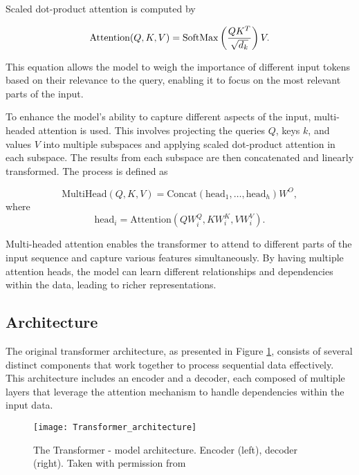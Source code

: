 \documentclass[../../thesis.tex]{subfiles}
\begin{document}
Scaled dot-product attention is computed by 

\begin{equation}
    \text{Attention}(Q,K,V) = \operatorname{SoftMax} \left(\frac{QK^T}{\sqrt{d_k}}\right)V.
\end{equation}

This equation allows the model to weigh the importance of different input tokens based on their relevance to the query, enabling it to focus on the most relevant parts of the input.\newline


To enhance the model's ability to capture different aspects of the input, multi-headed attention is used. This involves projecting the queries $Q$, keys $k$, and values $V$ into multiple subspaces and applying scaled dot-product attention in each subspace. The results from each subspace are then concatenated and linearly transformed. The process is defined as

\begin{equation}
    \text{MultiHead}(Q,K,V) = \text{Concat}(\text{head}_1,\dots, \text{head}_h)W^O,
\end{equation}
where
\begin{equation}
    \text{head}_i = \text{Attention}(QW_i^Q,KW_i^K,VW_i^V). 
\end{equation}

Multi-headed attention enables the transformer to attend to different parts of the input sequence and capture various features simultaneously. By having multiple attention heads, the model can learn different relationships and dependencies within the data, leading to richer representations.

\subsection{Architecture}

The original transformer architecture, as presented in Figure \ref{fig:transformer}, consists of several distinct components that work together to process sequential data effectively. This architecture includes an encoder and a decoder, each composed of multiple layers that leverage the attention mechanism to handle dependencies within the input data.\newline

\begin{figure}[h]
    \texttt{[image: Transformer\_architecture]}
    \centering 
    \caption{The Transformer - model architecture. Encoder (left), decoder (right). Taken with permission from \cite{vaswani2023attention}}
    \label{fig:transformer}
\end{figure}
\end{document}
